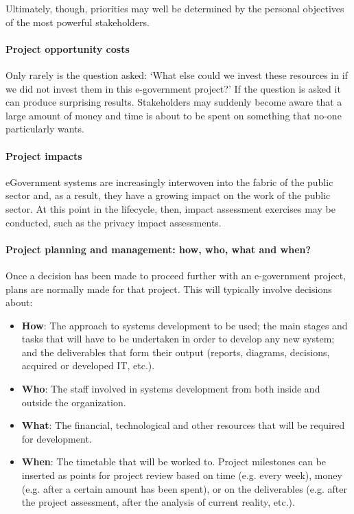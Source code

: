 Ultimately, though, priorities may well be
determined by the personal objectives of
the most powerful stakeholders.



\paragraph*{Project opportunity costs}
Only rarely is the question asked: ‘What
else could we invest these resources in if we
did not invest them in this e-government
project?’ If the question is asked it can produce surprising results. Stakeholders may
suddenly become aware that a large amount
of money and time is about to be spent on
something that no-one particularly wants.


\paragraph*{Project impacts}
eGovernment systems are increasingly
interwoven into the fabric of the public
sector and, as a result, they have a growing
impact on the work of the public sector. At
this point in the lifecycle, then, impact
assessment exercises may be conducted,
such as the privacy impact assessments.


\paragraph*{Project planning and management: how, who, what and when?}
Once a decision has been made to proceed
further with an e-government project, plans
are normally made for that project. This will
typically involve decisions about:

\begin{itemize}
	\item \textbf{How}: The approach to systems development to be used; the main stages and
	tasks that will have to be undertaken in
	order to develop any new system; and
	the deliverables that form their output
	(reports, diagrams, decisions, acquired or
	developed IT, etc.).
	
	\item \textbf{Who}: The staff involved in systems
	development from both inside and outside the organization.
	\item \textbf{What}: The financial, technological and
	other resources that will be required for
	development.
	\item \textbf{When}: The timetable that will be worked
	to. Project milestones can be inserted as
	points for project review based on time
	(e.g. every week), money (e.g. after a
	certain amount has been spent), or on the
	deliverables (e.g. after the project assessment, after the analysis of current reality,
	etc.).
\end{itemize}

